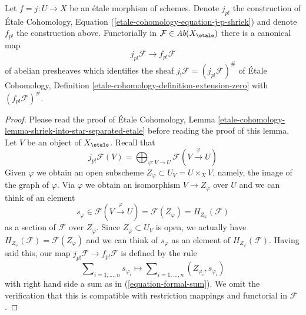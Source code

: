\begin{lemma}
\label{lemma-finite-support-etale-shriek}
Let $f = j : U \to X$ be an \'etale morphism of schemes. Denote $j_{p!}$
the construction of \'Etale Cohomology, Equation
(\ref{etale-cohomology-equation-j-p-shriek})
and denote $f_{p!}$ the construction above. Functorially in
$\mathcal{F} \in \textit{Ab}(X_\etale)$ there is a canonical map
$$
j_{p!}\mathcal{F} \longrightarrow f_{p!}\mathcal{F}
$$
of abelian presheaves which identifies the sheaf
$j_!\mathcal{F} = (j_{p!}\mathcal{F})^\#$ of \'Etale Cohomology,
Definition \ref{etale-cohomology-definition-extension-zero}
with $(f_{p!}\mathcal{F})^\#$.
\end{lemma}

\begin{proof}
Please read the proof of \'Etale Cohomology, Lemma
\ref{etale-cohomology-lemma-shriek-into-star-separated-etale}
before reading the proof of this lemma.
Let $V$ be an object of $X_\etale$. Recall that
$$
j_{p!}\mathcal{F}(V) =
\bigoplus\nolimits_{\varphi : V \to U} \mathcal{F}(V \xrightarrow{\varphi} U)
$$
Given $\varphi$ we obtain an open subscheme
$Z_\varphi \subset U_V = U \times_X V$, namely,
the image of the graph of $\varphi$. Via $\varphi$
we obtain an isomorphism $V \to Z_\varphi$ over $U$
and we can think of an element
$$
s_\varphi \in \mathcal{F}(V \xrightarrow{\varphi} U) =
\mathcal{F}(Z_\varphi) = H_{Z_\varphi}(\mathcal{F})
$$
as a section of $\mathcal{F}$ over $Z_{\varphi}$. Since
$Z_\varphi \subset U_V$ is open, we actually have
$H_{Z_\varphi}(\mathcal{F}) = \mathcal{F}(Z_\varphi)$
and we can think of $s_\varphi$ as an element of $H_{Z_\varphi}(\mathcal{F})$.
Having said this, our map $j_{p!}\mathcal{F} \to f_{p!}\mathcal{F}$
is defined by the rule
$$
\sum\nolimits_{i = 1, \ldots, n} s_{\varphi_i}
\longmapsto
\sum\nolimits_{i = 1, \ldots, n} (Z_{\varphi_i}, s_{\varphi_i})
$$
with right hand side a sum as in (\ref{equation-formal-sum}).
We omit the verification that this is compatible with restriction
mappings and functorial in $\mathcal{F}$.


\end{proof}
